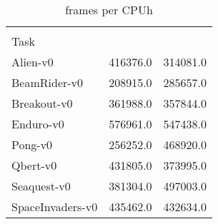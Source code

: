 \begin{table}[H]
\begin{small}
\begin{center}\begin{tabular}{lrr}

 &  \canonical{} &  \openaies{} \\
Task              &               &            \\
\hline
Alien-v0         &      416376.0 &   314081.0 \\
BeamRider-v0     &      208915.0 &   285657.0 \\
Breakout-v0      &      361988.0 &   357844.0 \\
Enduro-v0        &      576961.0 &   547438.0 \\
Pong-v0          &      256252.0 &   468920.0 \\
Qbert-v0         &      431805.0 &   373995.0 \\
Seaquest-v0      &      381304.0 &   497003.0 \\
SpaceInvaders-v0 &      435462.0 &   432634.0 \\

\end{tabular}
\caption{frames per CPUh}
\label{tab:berl_frames}
\end{center}
\end{small}
\end{table}